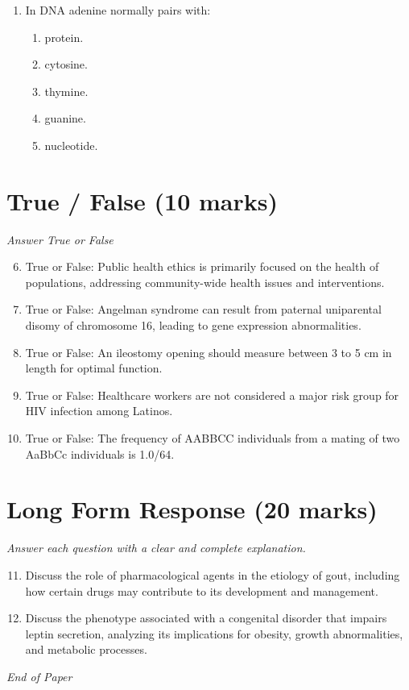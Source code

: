 \documentclass[12pt]{article}
\begin{document}
\begin{enumerate}[label=\arabic*.]
\begin{enumerate}[label=(\alph*)]
    \item Nitrous Oxide
    \item Nitric Acid
    \item Nitrites
    \item Nitrogen
\end{enumerate}
\item In DNA adenine normally pairs with:
\begin{enumerate}[label=(\alph*)]
    \item protein.
    \item cytosine.
    \item thymine.
    \item guanine.
    \item nucleotide.
\end{enumerate}
\end{enumerate}

\section*{True / False (10 marks)}
\textit{Answer True or False}
\begin{enumerate}[label=\arabic*.]
\setcounter{enumi}{5}
\item True or False: Public health ethics is primarily focused on the health of populations, addressing community-wide health issues and interventions.
\item True or False: Angelman syndrome can result from paternal uniparental disomy of chromosome 16, leading to gene expression abnormalities.
\item True or False: An ileostomy opening should measure between 3 to 5 cm in length for optimal function.
\item True or False: Healthcare workers are not considered a major risk group for HIV infection among Latinos.
\item True or False: The frequency of AABBCC individuals from a mating of two AaBbCc individuals is 1.0/64.
\end{enumerate}

\section*{Long Form Response (20 marks)}
\textit{Answer each question with a clear and complete explanation.}
\begin{enumerate}[label=\arabic*.]
\setcounter{enumi}{10}
\item Discuss the role of pharmacological agents in the etiology of gout, including how certain drugs may contribute to its development and management.
\item Discuss the phenotype associated with a congenital disorder that impairs leptin secretion, analyzing its implications for obesity, growth abnormalities, and metabolic processes.
\end{enumerate}

\vfill
\noindent\textit{End of Paper}
\end{document}

